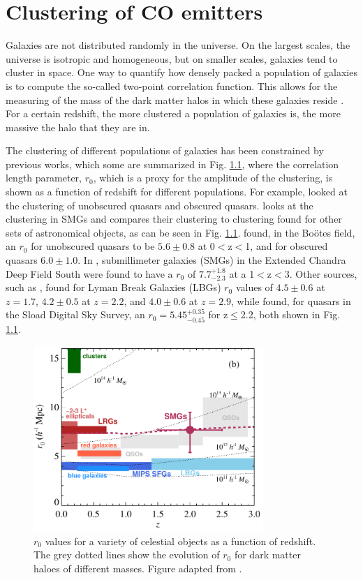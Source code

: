 \chapter{Clustering of CO emitters}

Galaxies are not distributed randomly in the universe. On the largest scales, the universe is isotropic and homogeneous, but on smaller scales, galaxies tend to cluster in space. One way to quantify how densely packed a population of galaxies is to compute the so-called two-point correlation function. This allows for the measuring of the mass of the dark matter halos in which these galaxies reside \cite{hickox2011clustering}. For a certain redshift, the more clustered a population of galaxies is, the more massive the halo that they are in.

The clustering of different populations of galaxies has been constrained by previous works, which some are summarized in Fig. \ref{fig:Hickox_compare}, where the correlation length parameter, $r_0$, which is a proxy for the amplitude of the clustering, is shown as a function of redshift for different populations. For example, \cite{hickox2011clustering} looked at the clustering of unobscured quasars and obscured quasars. \cite{10.1111/j.1365-2966.2011.20303.x} looks at the clustering in SMGs and compares their clustering to clustering found for other sets of astronomical objects, as can be seen in Fig. \ref{fig:Hickox_compare}. \cite{hickox2011clustering} found, in the Bo\"otes field, an $r_0$ for unobscured quasars to be $5.6 \pm 0.8$ at 0$<$z$<$1, and for obscured quasars $6.0 \pm 1.0 $. In \cite{10.1111/j.1365-2966.2011.20303.x}, submillimeter galaxies (SMGs) in the Extended Chandra Deep Field South were found to have a $r_0$ of $7.7_{-2.3}^{+1.8}$ at a 1$<$z$<$3. Other sources, such as \cite{adelberger2005spatial}, found for Lyman Break Galaxies (LBGs) $r_0$ values of $4.5 \pm 0.6$ at $z = 1.7$, $4.2 \pm 0.5$ at $z = 2.2$, and $4.0 \pm 0.6$ at $z = 2.9$, while \cite{ross2009clustering} found, for quasars in the Sload Digital Sky Survey, an $r_0 = 5.45_{-0.45}^{+0.35}$ for z$\leq$2.2, both shown in Fig. \ref{fig:Hickox_compare}. 

\begin{figure}[!htbp]
\centering \includegraphics[width=87mm]{clustering/Hickox2012_Compare.png}
\caption{$r_0$ values for a variety of celestial objects as a function of redshift. The grey dotted lines show the evolution of $r_0$ for dark matter haloes of different masses. Figure adapted from \cite{10.1111/j.1365-2966.2011.20303.x}.}
\label{fig:Hickox_compare}
\end{figure}

